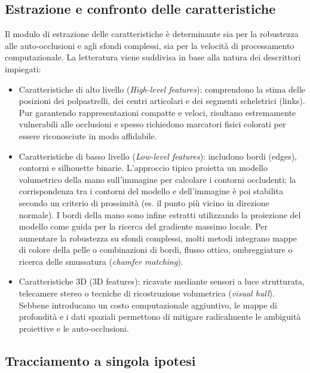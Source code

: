 \subsection{Estrazione e confronto delle caratteristiche}

Il modulo di estrazione delle caratteristiche è determinante sia per la robustezza alle auto-occlusioni e agli sfondi complessi, sia per la velocità di processamento computazionale.
La letteratura viene suddivisa in base alla natura dei descrittori impiegati:

\begin{itemize}
    \item Caratteristiche di alto livello (\emph{High-level features}):
    comprendono la stima delle posizioni dei polpastrelli, dei centri articolari e dei segmenti scheletrici (links).
    Pur garantendo rappresentazioni compatte e veloci, risultano estremamente vulnerabili alle occlusioni e spesso richiedono marcatori fisici colorati per essere riconosciute in modo affidabile.

    \item Caratteristiche di basso livello (\emph{Low-level features}):
    includono bordi (edges), contorni e silhouette binarie.
    L'approccio tipico proietta un modello volumetrico della mano sull'immagine per calcolare i contorni occludenti;
    la corrispondenza tra i contorni del modello e dell'immagine è poi stabilita secondo un criterio di prossimità (es. il punto più vicino in direzione normale).
    I bordi della mano sono infine estratti utilizzando la proiezione del modello come guida per la ricerca del gradiente massimo locale.
    Per aumentare la robustezza su sfondi complessi, molti metodi integrano mappe di colore della pelle o combinazioni di bordi, flusso ottico, ombreggiature o ricerca delle smussatura (\emph{chamfer matching}).

    \item Caratteristiche 3D (3D features): 
    ricavate mediante sensori a luce strutturata, telecamere stereo o tecniche di ricostruzione volumetrica (\emph{visual hull}). 
    Sebbene introducano un costo computazionale aggiuntivo, le mappe di profondità e i dati spaziali permettono di mitigare radicalmente le ambiguità proiettive e le auto-occlusioni.
\end{itemize}


\subsection{Tracciamento a singola ipotesi}

